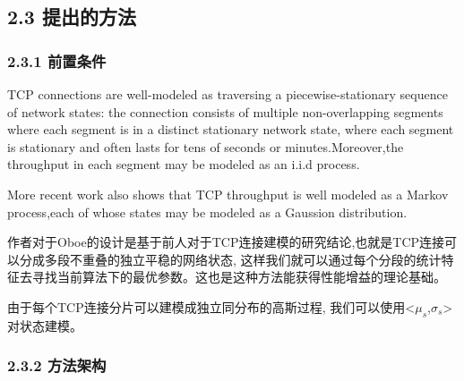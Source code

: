 \documentclass{\SetClass}
\begin{document}
    \subsection*{2.3 提出的方法}
    \subsubsection*{2.3.1 前置条件}
    
    \par TCP connections are well-modeled as traversing a piecewise-stationary sequence of network states:
    the connection consists of multiple non-overlapping segments where each segment is in a distinct stationary 
    network state, where each segment is stationary and often lasts for tens of seconds or minutes.Moreover,the
    throughput in each segment may be modeled as an i.i.d process.
    \par More recent work also shows that TCP throughput is well modeled as a Markov process,each of whose states
    may be modeled as a Gaussion distribution.
    \par 作者对于Oboe的设计是基于前人对于TCP连接建模的研究结论,也就是TCP连接可以分成多段不重叠的独立平稳的网络状态,
    这样我们就可以通过每个分段的统计特征去寻找当前算法下的最优参数。这也是这种方法能获得性能增益的理论基础。
    \par 由于每个TCP连接分片可以建模成独立同分布的高斯过程, 我们可以使用<$\mu_s$,$\sigma_s$>
    对状态建模。

    \subsubsection*{2.3.2 方法架构}
\end{document}
